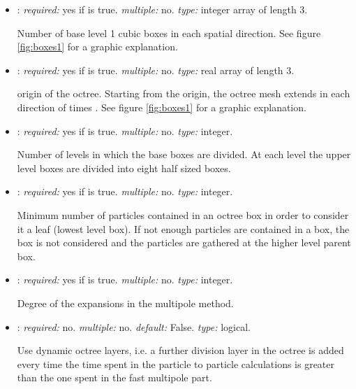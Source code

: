 \begin{itemize}
Length of the level 1 cubic boxes composing the octree. See figure 
\ref{fig:boxes1} for a graphic explanation.

\item {}: \textit{required:} yes if  is true. 
\textit{multiple:} no. \textit{type:} integer array of length 3.

Number of base level 1 cubic boxes in each spatial direction. See figure 
\ref{fig:boxes1} for a graphic explanation.

\item {}: \textit{required:} yes if  is true. 
\textit{multiple:} no. \textit{type:} real array of length 3. 

origin of the octree. Starting from the origin, the octree mesh extends in 
each direction of  times . 
See figure \ref{fig:boxes1} for a graphic explanation.

\item {}: \textit{required:} yes if  is true. 
\textit{multiple:} no. \textit{type:} integer.

Number of levels in  which the base boxes are divided. At each level 
the upper level boxes are divided into eight half sized boxes. 

\item {}: \textit{required:} yes if  is true. 
\textit{multiple:} no. \textit{type:} integer.

Minimum number of particles contained in an octree box in order to consider 
it a leaf (lowest level box). If not enough particles are contained in a 
box, the box is not considered and the particles are gathered at the higher 
level parent box.

\item {}: \textit{required:} yes if  is true. 
\textit{multiple:} no. \textit{type:} integer.

Degree of the expansions in the multipole method. 

\item {}: \textit{required:} no. \textit{multiple:} no. 
\textit{default:} False. \textit{type:} logical.

Use dynamic octree layers, i.e. a further division layer in the octree 
is added every time the time spent in the particle to particle calculations 
is greater than the one spent in the fast multipole part.


\end{itemize}
